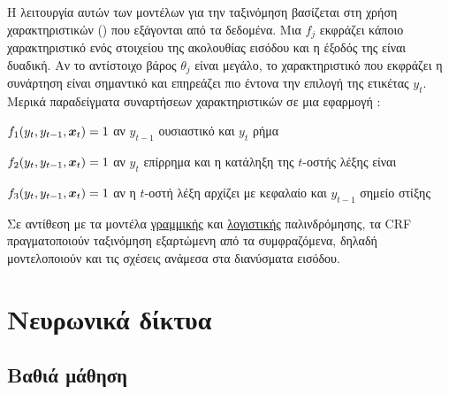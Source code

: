 Η λειτουργία αυτών των μοντέλων για την ταξινόμηση βασίζεται στη χρήση χαρακτηριστικών () που εξάγονται από τα δεδομένα.
Μια  $f_j$ εκφράζει κάποιο χαρακτηριστικό ενός στοιχείου της ακολουθίας εισόδου και η έξοδός της είναι δυαδική.
Αν το αντίστοιχο βάρος $\theta_j$ είναι μεγάλο, το χαρακτηριστικό που εκφράζει η συνάρτηση είναι σημαντικό και επηρεάζει πιο έντονα την επιλογή της ετικέτας $y_t$.
Μερικά παραδείγματα συναρτήσεων χαρακτηριστικών σε μια εφαρμογή :
\begin{compactitem}
    \item $f_1(y_t, y_{t-1}, \vx_t) = 1$ αν $y_{t-1}$ ουσιαστικό και $y_t$ ρήμα
    \item $f_2(y_t, y_{t-1}, \vx_t) = 1$ αν $y_t$ επίρρημα και η κατάληξη της $t$-οστής λέξης είναι 
    \item $f_3(y_t, y_{t-1}, \vx_t) = 1$ αν η $t$-οστή λέξη αρχίζει με κεφαλαίο και $y_{t-1}$ σημείο στίξης
\end{compactitem}

Σε αντίθεση με τα μοντέλα \hyperref[sec:linear-regression]{γραμμικής} και \hyperref[sec:logistic-regression]{λογιστικής} παλινδρόμησης,
τα CRF πραγματοποιούν ταξινόμηση εξαρτώμενη από τα συμφραζόμενα, δηλαδή μοντελοποιούν και τις σχέσεις ανάμεσα στα διανύσματα εισόδου.

\section{Νευρωνικά δίκτυα}\label{sec:neural-networks} %
\subsection{Βαθιά μάθηση}\label{subsec:deep-learning} %

